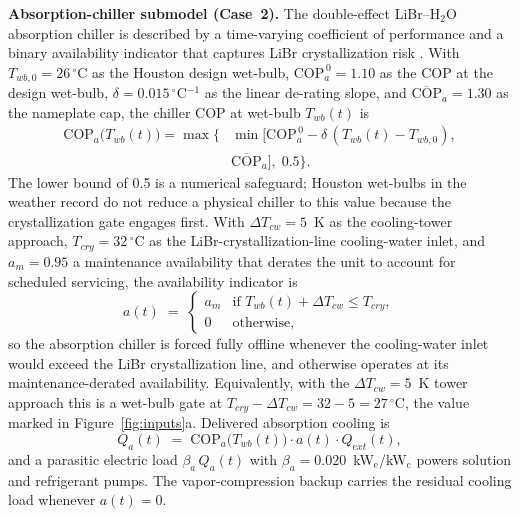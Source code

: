 \documentclass[a4paper,fleqn]{cas-sc}
\newcommand{\runinhead}[1]{\par\smallskip\noindent\textbf{#1.}\quad}
\begin{document}
\runinhead{Absorption-chiller submodel (Case~2)}
The double-effect LiBr--H$_2$O absorption chiller is described by a time-varying coefficient of performance and a binary availability indicator that captures LiBr crystallization risk \citep{srikhirin2001absorption,herold2016absorption}. With $T_{wb,0}=26\,^\circ$C as the Houston design wet-bulb, $\mathrm{COP}_a^{\,0}=1.10$ as the COP at the design wet-bulb, $\delta=0.015\,^\circ$C$^{-1}$ as the linear de-rating slope, and $\overline{\mathrm{COP}}_a=1.30$ as the nameplate cap, the chiller COP at wet-bulb $T_{wb}(t)$ is
\begin{equation}
\label{eq:cop_abs}
\begin{aligned}
\mathrm{COP}_a\!\big(T_{wb}(t)\big) =
\max\Big\{&
  \min\big[\mathrm{COP}_a^{\,0}
  - \delta\,(T_{wb}(t)-T_{wb,0}), \\
& \overline{\mathrm{COP}}_a\big],\; 0.5\Big\}.
\end{aligned}
\end{equation}
The lower bound of 0.5 is a numerical safeguard; Houston wet-bulbs in the weather record do not reduce a physical chiller to this value because the crystallization gate engages first. With $\Delta T_{cw}=5$~K as the cooling-tower approach, $T_{cry}=32\,^\circ$C as the LiBr-crystallization-line cooling-water inlet, and $a_m=0.95$ a maintenance availability that derates the unit to account for scheduled servicing, the availability indicator is
\begin{equation}
\label{eq:abs_avail}
a(t) \;=\; \begin{cases} a_m & \text{if } T_{wb}(t) + \Delta T_{cw} \le T_{cry}, \\ 0 & \text{otherwise}, \end{cases}
\end{equation}
so the absorption chiller is forced fully offline whenever the cooling-water inlet would exceed the LiBr crystallization line, and otherwise operates at its maintenance-derated availability. Equivalently, with the $\Delta T_{cw}=5$~K tower approach this is a wet-bulb gate at $T_{cry}-\Delta T_{cw}=32-5=27\,^\circ$C, the value marked in Figure~\ref{fig:inputs}a. Delivered absorption cooling is
\begin{equation}
\label{eq:abs_yield}
Q_{a}(t) \;=\; \mathrm{COP}_a\!\big(T_{wb}(t)\big)\cdot a(t)\cdot Q_{ext}(t),
\end{equation}
and a parasitic electric load $\beta_a\, Q_a(t)$ with $\beta_a=0.020$~kW$_\mathrm{e}$/kW$_\mathrm{c}$ powers solution and refrigerant pumps. The vapor-compression backup carries the residual cooling load whenever $a(t)=0$.
\end{document}

